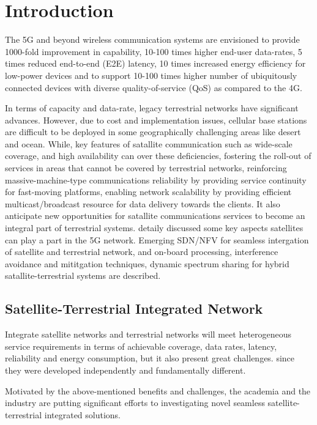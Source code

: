 \documentclass[12pt, draftclsnofoot, onecolumn]{IEEEtran}
\begin{document}
\section{Introduction}


The 5G and beyond wireless communication systems are envisioned to provide 1000-fold improvement in capability, 10-100 times higher end-user data-rates, 5 times reduced end-to-end (E2E) latency, 10 times increased energy efficiency for low-power devices and to support 10-100 times higher number of ubiquitously connected devices with diverse quality-of-service (QoS) as compared to the 4G\cite{sharma2018satellite}.

In terms of capacity and data-rate, legacy terrestrial networks have significant advances. However, due to cost and implementation issues, cellular base stations are difficult to be deployed in some geographically challenging areas like desert and ocean. While, key features of satallite communication such as wide-scale coverage, and high availability can over these deficiencies, fostering the roll-out of services in areas that cannot be covered by terrestrial networks, reinforcing massive-machine-type communications reliability by providing service continuity for fast-moving platforms, enabling network scalability by providing efficient multicast/broadcast resource for data delivery towards the clients. It also anticipate new opportunities for satallite communications services to become an integral part of terrestrial systems. \cite{sharma2018satellite} detaily discussed some key aspects satellites can play a part in the 5G network. Emerging SDN/NFV for seamless intergation of satellite and terrestrial network, and on-board processing, interference avoidance and mititgation techniques, dynamic spectrum sharing for hybrid satallite-terrestrial systems are described. 


\subsection{Satellite-Terrestrial Integrated Network} 
Integrate satellite networks and terrestrial networks will meet heterogeneous service requirements in terms of achievable coverage, data rates, latency, reliability and energy consumption, but it also present great challenges. since they were developed independently and fundamentally different.

Motivated by the above-mentioned benefits and challenges, the academia and the industry are putting significant efforts to investigating novel seamless satellite-terrestrial integrated solutions. 
\end{document}

